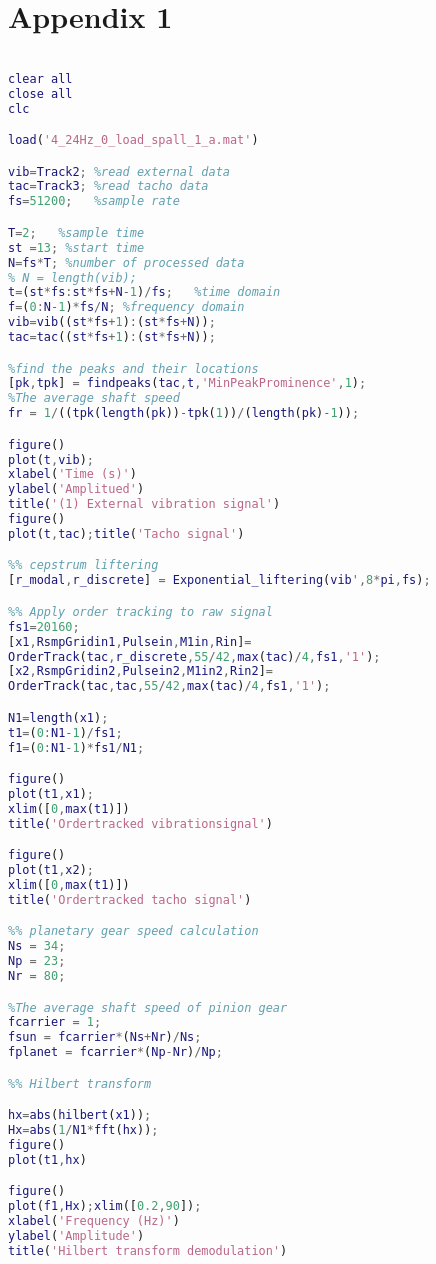 \chapter{Appendix 1}\label{app1}

\begin{lstlisting}[language=Matlab,
	keywordstyle=\color{blue!70},
	commentstyle=\color{red!50!green!50!blue!50}]

clear all
close all
clc

load('4_24Hz_0_load_spall_1_a.mat')

vib=Track2; %read external data
tac=Track3; %read tacho data
fs=51200;   %sample rate

T=2;   %sample time
st =13; %start time
N=fs*T; %number of processed data
% N = length(vib);
t=(st*fs:st*fs+N-1)/fs;   %time domain
f=(0:N-1)*fs/N; %frequency domain
vib=vib((st*fs+1):(st*fs+N));
tac=tac((st*fs+1):(st*fs+N));

%find the peaks and their locations
[pk,tpk] = findpeaks(tac,t,'MinPeakProminence',1);
%The average shaft speed
fr = 1/((tpk(length(pk))-tpk(1))/(length(pk)-1));

figure()
plot(t,vib);
xlabel('Time (s)')
ylabel('Amplitued')
title('(1) External vibration signal')
figure()
plot(t,tac);title('Tacho signal')

%% cepstrum liftering
[r_modal,r_discrete] = Exponential_liftering(vib',8*pi,fs);

%% Apply order tracking to raw signal
fs1=20160; 
[x1,RsmpGridin1,Pulsein,M1in,Rin]=
OrderTrack(tac,r_discrete,55/42,max(tac)/4,fs1,'1'); 
[x2,RsmpGridin2,Pulsein2,M1in2,Rin2]=
OrderTrack(tac,tac,55/42,max(tac)/4,fs1,'1');  

N1=length(x1);
t1=(0:N1-1)/fs1;
f1=(0:N1-1)*fs1/N1;

figure()
plot(t1,x1);
xlim([0,max(t1)])
title('Ordertracked vibrationsignal')

figure()
plot(t1,x2);
xlim([0,max(t1)])
title('Ordertracked tacho signal')

%% planetary gear speed calculation
Ns = 34;
Np = 23;
Nr = 80;

%The average shaft speed of pinion gear
fcarrier = 1;
fsun = fcarrier*(Ns+Nr)/Ns;
fplanet = fcarrier*(Np-Nr)/Np;

%% Hilbert transform

hx=abs(hilbert(x1));
Hx=abs(1/N1*fft(hx));
figure()
plot(t1,hx)

figure()
plot(f1,Hx);xlim([0.2,90]);
xlabel('Frequency (Hz)')
ylabel('Amplitude')
title('Hilbert transform demodulation')


\end{lstlisting}
